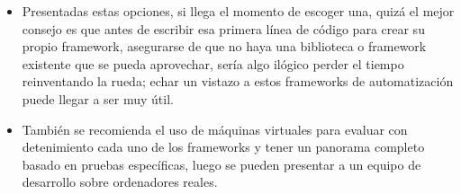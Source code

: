 \documentclass[twoside,twocolumn]{article}
\begin{document}
\begin{itemize}
\item Presentadas estas opciones, si llega el momento de escoger una, quizá el mejor consejo es que antes de escribir esa primera línea de código para crear su propio framework, asegurarse de que no haya una biblioteca o framework existente que se pueda aprovechar, sería algo ilógico perder el tiempo reinventando la rueda; echar un vistazo a estos frameworks de automatización puede llegar a ser muy útil.
\item También se recomienda el uso de máquinas virtuales para evaluar con detenimiento cada uno de los frameworks y tener un panorama completo basado en pruebas específicas, luego se pueden presentar a un equipo de desarrollo sobre ordenadores reales.
\end{itemize}



\end{document}
